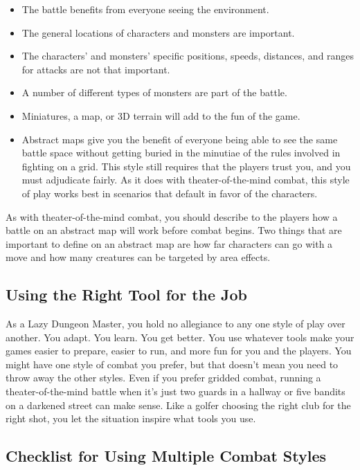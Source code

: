 \documentclass[10pt,a4paper,twoside,bg=print,twocolumn,openany,nodeprecatedcode]{dndbook}
\begin{document}
\begin{itemize}
\item The battle benefits from everyone seeing the environment.
\item The general locations of characters and monsters are important.
\item The characters' and monsters' specific positions, speeds, distances, and ranges for attacks are not that important.
\item A number of different types of monsters are part of the battle.
\item Miniatures, a map, or 3D terrain will add to the fun of the game.
\item Abstract maps give you the benefit of everyone being able to see the same battle space without getting buried in the minutiae of the rules involved in fighting on a grid. This style still requires that the players trust you, and you must adjudicate fairly. As it does with theater-of-the-mind combat, this style of play works best in scenarios that default in favor of the characters.
\end{itemize}

As with theater-of-the-mind combat, you should describe to the players how a battle on an abstract map will work before combat begins. Two things that are important to define on an abstract map are how far characters can go with a move and how many creatures can be targeted by area effects.
\subsection{Using the Right Tool for the Job}
As a Lazy Dungeon Master, you hold no allegiance to any one style of play over another. You adapt. You learn. You get better. You use whatever tools make your games easier to prepare, easier to run, and more fun for you and the players. You might have one style of combat you prefer, but that doesn't mean you need to throw away the other styles. Even if you prefer gridded combat, running a theater-of-the-mind battle when it's just two guards in a hallway or five bandits on a darkened street can make sense. Like a golfer choosing the right club for the right shot, you let the situation inspire what tools you use.
\subsection{Checklist for Using Multiple Combat Styles}
\end{document}
